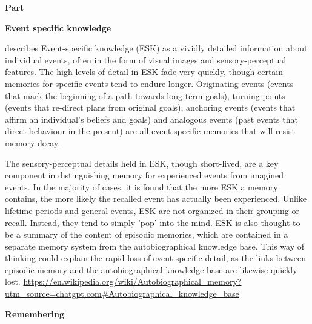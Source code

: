 \documentclass{book}
\providecommand{\ProjectDeepHeading}[2]{%
    \par\medskip\noindent\textbf{#2}\par\smallskip
}
\begin{document}
\ProjectDeepHeading{14}{Part}

\ProjectDeepHeading{15}{Event specific knowledge}


\cite{pillemer-2001-momentous-events-and-the-life-story} describes Event-specific knowledge (ESK) as a vividly detailed information about individual events, often in the form of visual images and sensory-perceptual features. The high levels of detail in ESK fade very quickly, though certain memories for specific events tend to endure longer. Originating events (events that mark the beginning of a path towards long-term goals), turning points (events that re-direct plans from original goals), anchoring events (events that affirm an individual's beliefs and goals) and analogous events (past events that direct behaviour in the present) are all event specific memories that will resist memory decay.
    
    The sensory-perceptual details held in ESK, though short-lived, are a key component in distinguishing memory for experienced events from imagined events. In the majority of cases, it is found that the more ESK a memory contains, the more likely the recalled event has actually been experienced. Unlike lifetime periods and general events, ESK are not organized in their grouping or recall. Instead, they tend to simply 'pop' into the mind. ESK is also thought to be a summary of the content of episodic memories, which are contained in a separate memory system from the autobiographical knowledge base. This way of thinking could explain the rapid loss of event-specific detail, as the links between episodic memory and the autobiographical knowledge base are likewise quickly lost.
    \url{https://en.wikipedia.org/wiki/Autobiographical_memory?utm_source=chatgpt.com\#Autobiographical_knowledge_base}

\ProjectDeepHeading{16}{Remembering}

\end{document}

